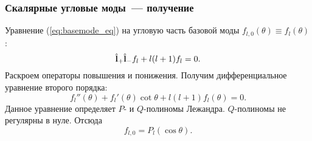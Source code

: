 \documentclass{beamer}
\begin{document}

    \begin{frame}\frametitle{Скалярные угловые моды~--- получение}

        Уравнение (\autoref{eq:basemode_eq}) на угловую часть базовой моды $f_{l,0}(\theta) \equiv f_l(\theta)$:
        \begin{equation}
            \hat{\mathbf{l}}_{+} \hat{\mathbf{l}}_{-} f_l + l (l + 1) f_l = 0 .
        \end{equation}
        Раскроем операторы повышения и понижения. Получим дифференциальное уравнение второго порядка:
        \begin{equation}
            f_l''(\theta) + f_l'(\theta) \cot \theta + l (l + 1) f_l(\theta) = 0 .
        \end{equation}
        Данное уравнение определяет $P$- и $Q$-полиномы Лежандра. $Q$-полиномы не регулярны в нуле. Отсюда
        \begin{equation}\label{eq:basemode_angle}
            f_{l,0} = P_l(\cos\theta) .
        \end{equation}

    \end{frame}

\end{document}
